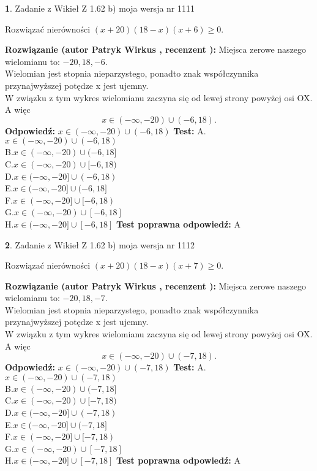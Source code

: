\documentclass[12pt, a4paper]{article}
\theoremstyle{definition} %
\newtheorem{zad}{}
\newcommand{\zadStart}[1]{\begin{zad}#1\newline}
\newcommand{\zadStop}{\end{zad}}
\newcommand{\rozwStart}[2]{\noindent \textbf{Rozwiązanie (autor #1 , recenzent #2): }\newline}
\newcommand{\rozwStop}{\newline}
\newcommand{\odpStart}{\noindent \textbf{Odpowiedź:}\newline}
\newcommand{\odpStop}{\newline}
\newcommand{\testStart}{\noindent \textbf{Test:}\newline}
\newcommand{\testStop}{\newline}
\newcommand{\kluczStart}{\noindent \textbf{Test poprawna odpowiedź:}\newline}
\newcommand{\kluczStop}{\newline}
\begin{document}
\zadStart{Zadanie z Wikieł Z 1.62 b) moja wersja nr 1111}

Rozwiązać nierówności $(x+20)(18-x)(x+6)\ge0$.
\zadStop
\rozwStart{Patryk Wirkus}{}
Miejsca zerowe naszego wielomianu to: $-20, 18, -6$.\\
Wielomian jest stopnia nieparzystego, ponadto znak współczynnika przy\linebreak najwyższej potędze x jest ujemny.\\ W związku z tym wykres wielomianu zaczyna się od lewej strony powyżej osi OX. A więc $$x \in (-\infty,-20) \cup (-6,18).$$
\rozwStop
\odpStart
$x \in (-\infty,-20) \cup (-6,18)$
\odpStop
\testStart
A.$x \in (-\infty,-20) \cup (-6,18)$\\
B.$x \in (-\infty,-20) \cup (-6,18]$\\
C.$x \in (-\infty,-20) \cup [-6,18)$\\
D.$x \in (-\infty,-20] \cup (-6,18)$\\
E.$x \in (-\infty,-20] \cup (-6,18]$\\
F.$x \in (-\infty,-20] \cup [-6,18)$\\
G.$x \in (-\infty,-20) \cup [-6,18]$\\
H.$x \in (-\infty,-20] \cup [-6,18]$
\testStop
\kluczStart
A
\kluczStop



\zadStart{Zadanie z Wikieł Z 1.62 b) moja wersja nr 1112}

Rozwiązać nierówności $(x+20)(18-x)(x+7)\ge0$.
\zadStop
\rozwStart{Patryk Wirkus}{}
Miejsca zerowe naszego wielomianu to: $-20, 18, -7$.\\
Wielomian jest stopnia nieparzystego, ponadto znak współczynnika przy\linebreak najwyższej potędze x jest ujemny.\\ W związku z tym wykres wielomianu zaczyna się od lewej strony powyżej osi OX. A więc $$x \in (-\infty,-20) \cup (-7,18).$$
\rozwStop
\odpStart
$x \in (-\infty,-20) \cup (-7,18)$
\odpStop
\testStart
A.$x \in (-\infty,-20) \cup (-7,18)$\\
B.$x \in (-\infty,-20) \cup (-7,18]$\\
C.$x \in (-\infty,-20) \cup [-7,18)$\\
D.$x \in (-\infty,-20] \cup (-7,18)$\\
E.$x \in (-\infty,-20] \cup (-7,18]$\\
F.$x \in (-\infty,-20] \cup [-7,18)$\\
G.$x \in (-\infty,-20) \cup [-7,18]$\\
H.$x \in (-\infty,-20] \cup [-7,18]$
\testStop
\kluczStart
A
\kluczStop
\end{document}
